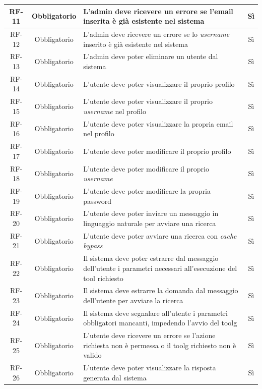 \begin{center}
\begin{xltabular}{\textwidth}{|c|c| >{\arraybackslash}X|c|}
        \hline
        RF-11 & Obbligatorio & L'admin deve ricevere un errore se l'email inserita è già esistente nel sistema & Sì \\
        \hline
        RF-12 & Obbligatorio & L'admin deve ricevere un errore se lo \textit{username} inserito è già esistente nel sistema & Sì \\
        \hline
        RF-13 & Obbligatorio & L'admin deve poter eliminare un utente dal sistema & Sì \\
        \hline
        RF-14 & Obbligatorio & L'utente deve poter visualizzare il proprio profilo & Sì \\
        \hline
        RF-15 & Obbligatorio & L'utente deve poter visualizzare il proprio \textit{username} nel profilo & Sì \\
        \hline
        RF-16 & Obbligatorio & L'utente deve poter visualizzare la propria email nel profilo & Sì \\
        \hline
        RF-17 & Obbligatorio & L'utente deve poter modificare il proprio profilo & Sì \\
        \hline
        RF-18 & Obbligatorio & L'utente deve poter modificare il proprio \textit{username} & Sì \\
        \hline
        RF-19 & Obbligatorio & L'utente deve poter modificare la propria password & Sì \\
        \hline
        RF-20 & Obbligatorio & L'utente deve poter inviare un messaggio in linguaggio naturale per avviare una ricerca & Sì \\
        \hline
        RF-21 & Obbligatorio & L'utente deve poter avviare una ricerca con \textit{cache bypass} & Sì \\
        \hline
        RF-22 & Obbligatorio & Il sistema deve poter estrarre dal messaggio dell'utente i parametri necessari all'esecuzione del tool richiesto & Sì \\
        \hline
        RF-23 & Obbligatorio & Il sistema deve estrarre la domanda dal messaggio dell'utente per avviare la ricerca & Sì \\
        \hline
        RF-24 & Obbligatorio & Il sistema deve segnalare all'utente i parametri obbligatori mancanti, impedendo l'avvio del \gls{toolg} & Sì \\
        \hline
        RF-25 & Obbligatorio & L'utente deve ricevere un errore se l'azione richiesta non è permessa o il \gls{toolg} richiesto non è valido & Sì \\
        \hline
        RF-26 & Obbligatorio & L'utente deve poter visualizzare la risposta generata dal sistema & Sì \\

\end{xltabular}
\end{center}
